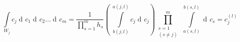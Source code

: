 \documentclass[11pt]{article}
\numberwithin{equation}{subsection}
\DeclareMathOperator{\di}{d\!}
\begin{document}
\begin{equation}
	\int \limits_{W_j} c_{j} \di c_{1} \di c_{2} \ldots  \di c_{m} 
	= \dfrac{1}{\prod\limits_{s=1}^{m}h_{s}}
	\left( \  \int\limits_{b(j,l)}^{a(j,l)} c_{j}  \di c_{j}\right) 
	\prod_{\substack{s=1\\ (s\ne j)}}^m \ 
	\int\limits_{a(s,l)}^{b(s,l)} \!  \di c_{s} 
	= c_{j}^{(l)} 
\label{eq_vector1}
\end{equation}
\end{document}

